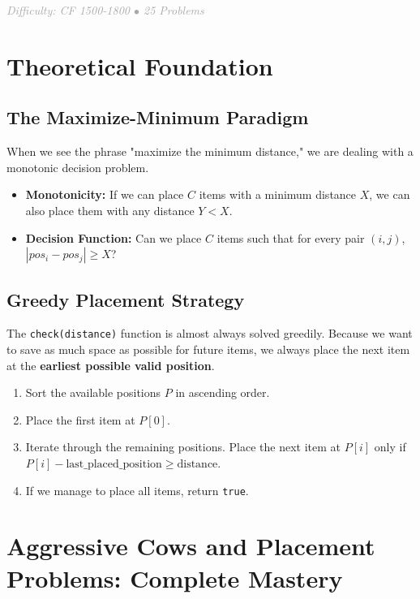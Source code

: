 \documentclass[11pt,a4paper,oneside]{book}
\begin{document}
\vspace{0.5cm}

\begin{center}
\textit{\textcolor{darkgray}{Difficulty: CF 1500-1800 $\bullet$ 25 Problems}}
\end{center}

\section{Theoretical Foundation}

\subsection{The Maximize-Minimum Paradigm}
When we see the phrase "maximize the minimum distance," we are dealing with a monotonic decision problem. 
\begin{itemize}
    \item \textbf{Monotonicity:} If we can place $C$ items with a minimum distance $X$, we can also place them with any distance $Y < X$.
    \item \textbf{Decision Function:} Can we place $C$ items such that for every pair $(i, j)$, $|pos_i - pos_j| \geq X$?
\end{itemize}

\subsection{Greedy Placement Strategy}
The \texttt{check(distance)} function is almost always solved greedily. Because we want to save as much space as possible for future items, we always place the next item at the \textbf{earliest possible valid position}.



\begin{enumerate}
    \item Sort the available positions $P$ in ascending order.
    \item Place the first item at $P[0]$.
    \item Iterate through the remaining positions. Place the next item at $P[i]$ only if $P[i] - \text{last\_placed\_position} \geq \text{distance}$.
    \item If we manage to place all items, return \texttt{true}.
\end{enumerate}

\section{Aggressive Cows and Placement Problems: Complete Mastery}
\end{document}
